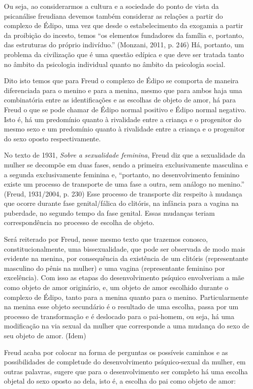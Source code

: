 Ou seja, ao considerarmos a cultura e a sociedade do ponto de vista da
psicanálise freudiana devemos também considerar as relações a partir do
complexo de Édipo, uma vez que desde o estabelecimento da exogamia a
partir da proibição do incesto, temos ``os elementos fundadores da
família e, portanto, das estruturas do próprio indivíduo.'' (Monzani,
2011, p. 246) Há, portanto, um problema da civilização que é uma questão
edípica e que deve ser tratada tanto no âmbito da psicologia individual
quanto no âmbito da psicologia social.

Dito isto temos que para Freud o complexo de Édipo se comporta de
maneira diferenciada para o menino e para a menina, mesmo que para ambos
haja uma combinatória entre as identificações e as escolhas de objeto de
amor, há para Freud o que se pode chamar de Édipo normal positivo e
Édipo normal negativo. Isto é, há um predomínio quanto à rivalidade
entre a criança e o progenitor do mesmo sexo e um predomínio quanto à
rivalidade entre a criança e o progenitor do sexo oposto
respectivamente.

No texto de 1931, \emph{Sobre a sexualidade feminina}, Freud diz que a
sexualidade da mulher se decompõe em duas fases, sendo a primeira
exclusivamente masculina e a segunda exclusivamente feminina e,
``portanto, no desenvolvimento feminino existe um processo de transporte
de uma fase a outra, sem análogo no menino.'' (Freud, 1931/2004, p. 230)
Esse processo de transporte diz respeito à mudança que ocorre durante
fase genital/fálica do clitóris, na infância para a vagina na puberdade,
no segundo tempo da fase genital. Essas mudanças teriam correspondência
no processo de escolha de objeto.

Será reiterado por Freud, nesse mesmo texto que trazemos conosco,
constitucionalmente, uma bissexualidade, que pode ser observada de modo
mais evidente na menina, por consequência da existência de um clitóris
(representante masculino do pênis na mulher) e uma vagina (representante
feminino por excelência). Com isso as etapas do desenvolvimento psíquico
envolveriam a mãe como objeto de amor originário, e, um objeto de amor
escolhido durante o complexo de Édipo, tanto para a menina quanto para o
menino. Particularmente na menina esse objeto secundário é o resultado
de uma escolha, passa por um processo de transformação e é deslocado
para o pai-homem, ou seja, há uma modificação na via sexual da mulher
que corresponde a uma mudança do sexo de seu objeto de amor. (Idem)

Freud acaba por colocar na forma de perguntas os possíveis caminhos e as
possibilidades de completude do desenvolvimento psíquico-sexual da
mulher, em outras palavras, sugere que para o desenvolvimento ser
completo há uma escolha objetal do sexo oposto ao dela, isto é, a
escolha do pai como objeto de amor:

